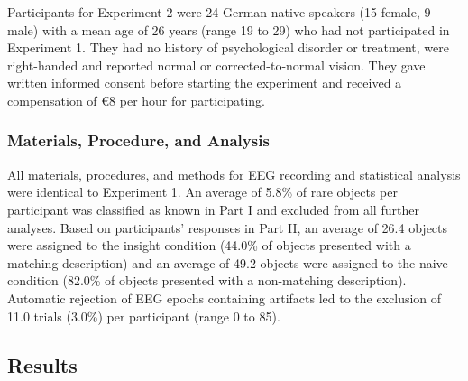\documentclass[
  english,
  man,11pt,floatsintext]{apa7}
\begin{document}
Participants for Experiment 2 were 24 German native speakers (15 female, 9 male) with a mean age of 26 years (range 19 to 29) who had not participated in Experiment 1. They had no history of psychological disorder or treatment, were right-handed and reported normal or corrected-to-normal vision. They gave written informed consent before starting the experiment and received a compensation of €8 per hour for participating.

\hypertarget{materials-procedure-and-analysis}{%
\subsubsection{Materials, Procedure, and Analysis}\label{materials-procedure-and-analysis}}

All materials, procedures, and methods for EEG recording and statistical analysis were identical to Experiment 1. An average of 5.8\% of rare objects per participant was classified as known in Part I and excluded from all further analyses. Based on participants' responses in Part II, an average of 26.4 objects were assigned to the insight condition (44.0\% of objects presented with a matching description) and an average of 49.2 objects were assigned to the naive condition (82.0\% of objects presented with a non-matching description). Automatic rejection of EEG epochs containing artifacts led to the exclusion of 11.0 trials (3.0\%) per participant (range 0 to 85).

\hypertarget{results-1}{%
\subsection{Results}\label{results-1}}
\end{document}
